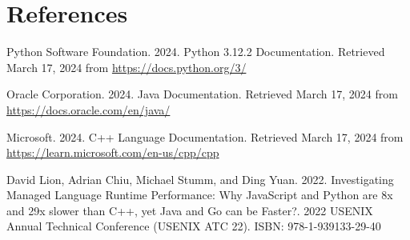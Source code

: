 \documentclass[sigconf, nonacm, authorversion, language=english, 12pt]{acmart}
\begin{document}
\section*{References}
\begin{enumerate}[label={[\arabic*]}]
  \item Python Software Foundation. 2024. Python 3.12.2 Documentation. Retrieved March 17, 2024 from \href{https://docs.python.org/3/}{https://docs.python.org/3/}\\

  \item Oracle Corporation. 2024. Java Documentation. Retrieved March 17, 2024 from\\ \href{https://docs.oracle.com/en/java/}{https://docs.oracle.com/en/java/}\\

  \item Microsoft. 2024. C++ Language Documentation. Retrieved March 17, 2024 from\\ \href{https://learn.microsoft.com/en-us/cpp/cpp/?view=msvc-170}{https://learn.microsoft.com/en-us/cpp/cpp}

  \item David Lion, Adrian Chiu, Michael Stumm, and Ding Yuan. 2022. Investigating Managed Language Runtime Performance: Why JavaScript and Python are 8x and 29x slower than C++, yet Java and Go can be Faster?.
        2022 USENIX Annual Technical Conference (USENIX ATC 22). ISBN: 978-1-939133-29-40\\





\end{enumerate}
\end{document}
